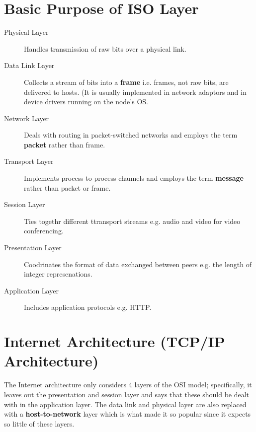 \documentclass[11pt]{article}
\begin{document}
\section{Basic Purpose of ISO Layer}
\label{sec:org7ebcd69}
\begin{description}
\item[{Physical Layer}] Handles transmission of raw bits over a physical link.
\item[{Data Link Layer}] Collects a stream of bits into a \textbf{frame} i.e. frames, not raw bits, are delivered to hosts. (It is usually implemented in network adaptors and in device drivers running on the node's OS.
\item[{Network Layer}] Deals with routing in packet-switched networks and employs the term \textbf{packet} rather than frame.
\item[{Transport Layer}] Implements process-to-process channels and employs the term \textbf{message} rather than packet or frame.
\item[{Session Layer}] Ties togethr different ttransport streams e.g. audio and video for video conferencing.
\item[{Presentation Layer}] Coodrinates the format of data exchanged between peers e.g. the length of integer represenations.
\item[{Application Layer}] Includes application protocols e.g. HTTP.
\end{description}

\section{Internet Architecture (TCP/IP Architecture)}
\label{sec:orgf072e28}
The Internet architecture only considers 4 layers of the OSI model; specifically, it leaves out the presentation and session layer and says that these should be dealt with in the application layer.
The data link and physical layer are also replaced with a \textbf{host-to-network} layer which is what made it so popular since it expects so little of these layers.
\end{document}
